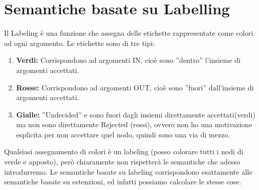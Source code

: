 \section{Semantiche basate su Labelling}
Il Labeling è una funzione che assegna delle etichette rappresentate come colori ad ogni argomento. Le etichette sono di tre tipi:
\begin{enumerate}
    \item \textbf{Verdi:} Corrispondono ad argomenti IN, cioè sono ”dentro” l’insieme di argomenti accettati.
    \item \textbf{Rosse:} Corrispondono ad argomenti OUT, cioè sono ”fuori” dall’insieme di argomenti accettati.
    \item \textbf{Gialle:} ”Undecided” e sono fuori dagli insiemi direttamente accettati(verdi) ma non sono direttamente Rejected (rossi), ovvero non ho una motivazione esplicita per non accettare quel nodo, quindi sono una via di mezzo.
\end{enumerate}
Qualsiasi assegnamento di colori è un labeling (posso colorare tutti i nodi di verde e apposto), però chiaramente non rispetterà le semantiche che adesso introdurremo. Le semantiche basate su labeling corrispondono esattamente alle semantiche basate su estenzioni, ed infatti possiamo calcolare le stesse
cose.
\newpage
